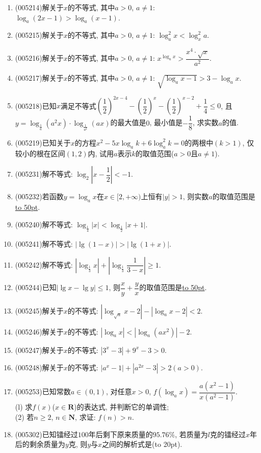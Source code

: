 \documentclass[10pt,a4paper]{article}
\newcommand{\blank}[1]{\underline{\hbox to #1pt{}}}
\newcommand{\bracket}[1]{(\hbox to #1pt{})}
\begin{document}
\begin{enumerate}[1.]
\item {\tiny (005214)}解关于$x$的不等式, 其中$a>0$, $a\ne 1$: $\log_a(2x-1)>\log_a(x-1)$.
\item {\tiny (005215)}解关于$x$的不等式, 其中$a>0$, $a\ne 1$: $\log_a^2x<\log_x^2a$.
\item {\tiny (005216)}解关于$x$的不等式, 其中$a>0$, $a\ne 1$: ${x^{\log_ax}}>\dfrac{x^4\cdot \sqrt x}{a^2}$.
\item {\tiny (005217)}解关于$x$的不等式, 其中$a>0$, $a\ne 1$: $\sqrt{\log_ax-1}>3-\log_ax$.
\item {\tiny (005218)}已知$x$满足不等式$(\dfrac 12)^{2x-4}-(\dfrac 12)^x-(\dfrac 12)^{x-2}+\dfrac 14\le 0$, 且$y=\log_{\frac 1a}(a^2x)\cdot \log_{\frac 1{a^2}}(ax)$的最大值是$0$, 最小值是$-\dfrac 18$, 求实数$a$的值.
\item {\tiny (005219)}已知关于$x$的方程$x^2-5x\log_ak+6\log _a^2k=0$的两根中$(k>1)$, 仅较小的根在区间$(1,2)$内, 试用$a$表示$k$的取值范围($a>0$且$a\ne 1$).
\item {\tiny (005231)}解不等式: $\log_2|x-\dfrac 12|<-1$.
\item {\tiny (005232)}若函数$y=\log_ax$在$x\in [2,+\infty)$上恒有$|y|>1$, 则实数$a$的取值范围是\blank{50}.
\item {\tiny (005240)}解不等式: $\log_{\frac 14}|x|<\log_{\frac 12}|x+1|$.
\item {\tiny (005241)}解不等式: $|\lg (1-x)|>|\lg (1+x)|$.
\item {\tiny (005242)}解不等式: $|\log_{\frac 13}x|+|\log_{\frac 13}\dfrac 1{3-x}|\ge 1$.
\item {\tiny (005244)}已知$|\lg x-\lg y|\le 1$, 则$\dfrac xy+\dfrac yx$的取值范围是\blank{50}.
\item {\tiny (005245)}解关于$x$的不等式: $|\log_{\sqrt a}x-2|-|\log_ax-2|<2$.
\item {\tiny (005246)}解关于$x$的不等式: $|\log_ax|<|\log_a(ax^2)|-2$.
\item {\tiny (005247)}解关于$x$的不等式: $|3^x-3|+9^x-3>0$.
\item {\tiny (005248)}解关于$x$的不等式: $|a^x-1|+|a^{2x}-3|>2(a>0)$.
\item {\tiny (005253)}已知常数$a\in (0,1)$, 对任意$x>0$, $f(\log_ax)=\dfrac{a(x^2-1)}{x(a^2-1)}$.\\
(l) 求$f(x)$($x\in \mathbf{R}$)的表达式, 并判断它的单调性;\\
(2) 若$n\ge 2$, $n\in \mathbf{N}$, 求证: $f(n)>n$.
\item {\tiny (005302)}已知镭经过$100$年后剩下原来质量的$95.76\%$, 若质量为$l$克的镭经过$x$年后的剩余质量为$y$克, 则$y$与$x$之间的解析式是\bracket{20}.

\end{enumerate}
\end{document}
